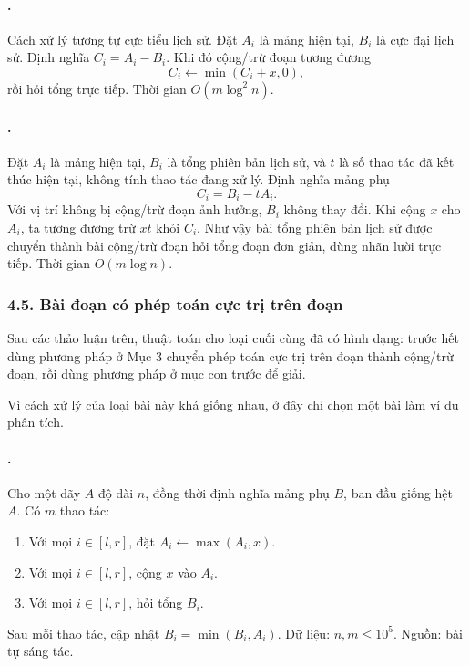 \documentclass[11pt]{article}
\begin{document}
\paragraph{.}
Cách xử lý tương tự cực tiểu lịch sử. Đặt \(A_i\) là mảng hiện tại,
\(B_i\) là cực đại lịch sử. Định nghĩa \(C_i=A_i-B_i\). Khi đó cộng/trừ đoạn
tương đương
\[
  C_i\leftarrow \min(C_i+x,0),
\]
rồi hỏi tổng trực tiếp. Thời gian \(O(m\log^2 n)\).

\paragraph{.}
Đặt \(A_i\) là mảng hiện tại, \(B_i\) là tổng phiên bản lịch sử, và \(t\) là
số thao tác đã kết thúc hiện tại, không tính thao tác đang xử lý. Định nghĩa
mảng phụ
\[
  C_i=B_i-tA_i.
\]
Với vị trí không bị cộng/trừ đoạn ảnh hưởng, \(B_i\) không thay đổi. Khi cộng
\(x\) cho \(A_i\), ta tương đương trừ \(xt\) khỏi \(C_i\). Như vậy bài tổng
phiên bản lịch sử được chuyển thành bài cộng/trừ đoạn hỏi tổng đoạn đơn giản,
dùng nhãn lười trực tiếp. Thời gian \(O(m\log n)\).

\subsubsection*{4.5. Bài đoạn có phép toán cực trị trên đoạn}

Sau các thảo luận trên, thuật toán cho loại cuối cùng đã có hình dạng: trước
hết dùng phương pháp ở Mục 3 chuyển phép toán cực trị trên đoạn thành
cộng/trừ đoạn, rồi dùng phương pháp ở mục con trước để giải.

Vì cách xử lý của loại bài này khá giống nhau, ở đây chỉ chọn một bài làm ví
dụ phân tích.

\paragraph{.}
Cho một dãy \(A\) độ dài \(n\), đồng thời định nghĩa mảng phụ \(B\), ban đầu
giống hệt \(A\). Có \(m\) thao tác:
\begin{enumerate}
  \item Với mọi \(i\in[l,r]\), đặt \(A_i\leftarrow \max(A_i,x)\).
  \item Với mọi \(i\in[l,r]\), cộng \(x\) vào \(A_i\).
  \item Với mọi \(i\in[l,r]\), hỏi tổng \(B_i\).
\end{enumerate}
Sau mỗi thao tác, cập nhật \(B_i=\min(B_i,A_i)\). Dữ liệu:
\(n,m\le 10^5\). Nguồn: bài tự sáng tác.
\end{document}
